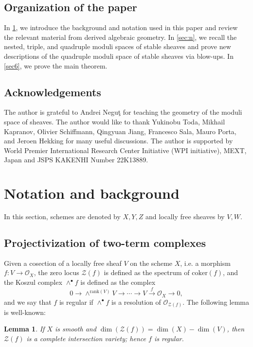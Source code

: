 \documentclass{amsart}
\numberwithin{equation}{section}
\newcommand\mc{\mathcal}
\newcommand{\rank}{\mathrm{rank}}
\newtheorem{lemma}[theorem]{Lemma}
\theoremstyle{definition}
\theoremstyle{remark}
\begin{document}
\subsection{Organization of the paper}
In \cref{sec2}, we introduce the background and notation used in this paper and review the relevant material from derived algebraic geometry. In \cref{sec:n}, we recall the nested, triple, and quadruple moduli spaces of stable sheaves and prove new descriptions of the quadruple moduli space of stable sheaves via blow-ups. In \cref{sec6}, we prove the main theorem.



\subsection{Acknowledgements}
The author is grateful to Andrei Negu\c{t} for teaching the geometry of the moduli space of sheaves. The author would like to thank Yukinobu Toda, Mikhail Kapranov, Olivier Schiffmann,  Qingyuan Jiang, Francesco Sala, Mauro Porta, and Jeroen Hekking for many useful discussions. The author is supported by World Premier International Research Center Initiative (WPI initiative), MEXT, Japan and JSPS KAKENHI Number 22K13889.

\section{Notation and background}
\label{sec2}
In this section, schemes are denoted by $X,Y,Z$ and locally free sheaves by $V,W$. 
\subsection{Projectivization of two-term complexes}
Given a cosection of a locally free sheaf $V$ on the scheme $X$, i.e. a morphism $f:V\to \mc{O}_X$, the zero locus $\mc{Z}(f)$ is defined as the spectrum of $\mathrm{coker}(f)$, and the Koszul complex $\wedge^{\bullet}f$ is defined as the complex
   $$0\to \wedge^{\rank(V)}V\to \cdots \to V\xrightarrow{f}\mc{O}_{X}\to 0,$$
and we say that $f$ is regular if $\wedge^{\bullet}f$ is a resolution of $\mc{O}_{\mc{Z}(f)}$. 
The following lemma is well-known:
\begin{lemma}
  \label{l21}
If $X$ is smooth and $\dim(\mc{Z}(f))=\dim(X)-\dim(V)$, then $\mc{Z}(f)$ is a complete intersection variety; hence $f$ is regular.  
\end{lemma}
\end{document}
